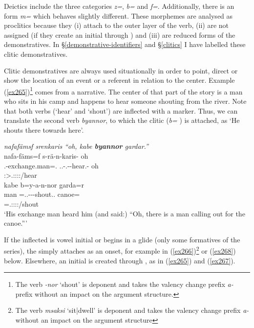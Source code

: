 Deictics include the three categories  \emph{z=},  \emph{b=} and  \emph{f=}. Additionally, there is an  form \emph{m=} which behaves slightly different. These morphemes are analysed as proclitics because they (i) attach to the outer layer of the verb, (ii) are not assigned  (if they create an initial  through ) and (iii) are reduced forms of the demonstratives. In \S{}\ref{demonstrative-identifiers} and \S{}\ref{clitics} I have labelled these clitic demonstratives.%

Clitic demonstratives are always used situationally in order to point, direct or show the location of an event or a referent in relation to the  center. Example (\ref{ex265})\footnote{The verb \emph{-nor} `shout' is deponent and takes the valency change prefix \emph{a-} prefix without an impact on the argument structure.} comes from a narrative. The  center of that part of the story is a man who sits in his camp and happens to hear someone shouting from the river. Note that both verbs (`hear' and `shout') are inflected with a  marker. Thus, we can translate the second verb \emph{byannor}, to which the  clitic  (\emph{b=} \Med) is attached, as `He shouts there towards here'.

\begin{exe}
	\ex \emph{nafafämsf srenkaris ``oh, kabe \textbf{byannor} gardar.''}\\
	\glll nafa-fäms=f s-rä-n-karis-\Zero{} oh\\
	\Third.\Poss-exchange.man=\Erg.\Sg{} \Tsg.\Masc.\Bet-\Irr.\Ndu-\Venit-hear.\Rs-\Stsg{} oh\\
	{} \footnotesize{\Stsg:\Sbj>\Tsg.\Masc:\Obj:\Irr:\Pfv:\Venit/hear} {}\\
	\sn
	\glll kabe b=y-a-n-nor garda=r\\
	man \Med=\Tsg.\Masc.\Alph-\Vc-\Venit-shout.\Ext.\Ndu{} canoe=\Purp{}\\
	{} \footnotesize{\Med=\Tsg.\Masc:\Sbj:\Nonpast:\Ipfv:\Venit/shout} {}\\
	\trans `His exchange man heard him (and said:) ``Oh, there is a man calling out for the canoe.''' 
	\label{ex265}
\end{exe}

If the inflected  is vowel initial or begins in a glide (only some formatives of the \Alph{} series), the   simply attaches as an onset, for example in (\ref{ex266})\footnote{The verb \emph{msaksi} `sit|dwell' is deponent and takes the valency change prefix \emph{a-} without an impact on the argument structure} or (\ref{ex268}) below. Elsewhere, an initial  is created through , as in (\ref{ex265}) and (\ref{ex267}).

